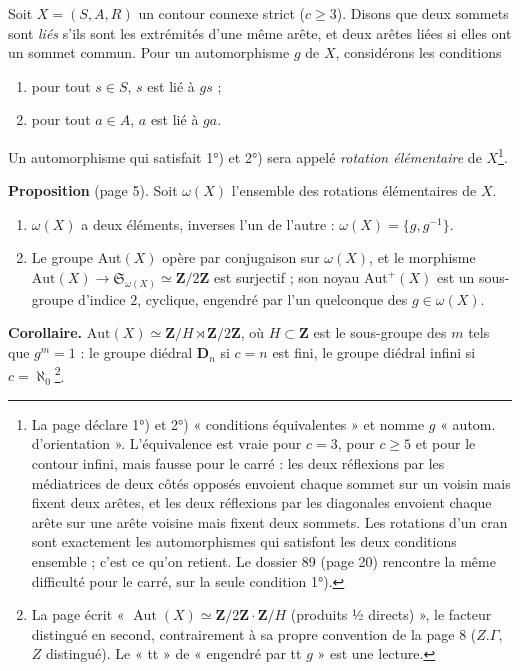 \documentclass[11pt,a4paper]{article}
\begin{document}
Soit $X = (S, A, R)$ un contour connexe strict ($c \geq 3$). Disons que deux
sommets sont \emph{liés} s'ils sont les extrémités d'une même arête, et deux
arêtes liées si elles ont un sommet commun. Pour un automorphisme $g$ de $X$,
considérons les conditions
\begin{enumerate}
\item[1°)] pour tout $s \in S$, $s$ est lié à $g s$ ;
\item[2°)] pour tout $a \in A$, $a$ est lié à $g a$.
\end{enumerate}
Un automorphisme qui satisfait 1°) et 2°) sera appelé \emph{rotation
élémentaire} de $X$\footnote{La page déclare 1°) et 2°) « conditions
équivalentes » et nomme $g$ « autom. d'orientation ». L'équivalence est vraie
pour $c = 3$, pour $c \geq 5$ et pour le contour infini, mais fausse pour le
carré : les deux réflexions par les médiatrices de deux côtés opposés
envoient chaque sommet sur un voisin mais fixent deux arêtes, et les deux
réflexions par les diagonales envoient chaque arête sur une arête voisine
mais fixent deux sommets. Les rotations d'un cran sont exactement les
automorphismes qui satisfont les deux conditions ensemble ; c'est ce qu'on
retient. Le dossier 89 (page 20) rencontre la même difficulté pour le carré,
sur la seule condition 1°).}.

\textbf{Proposition} (page 5). Soit $\omega(X)$ l'ensemble des rotations
élémentaires de $X$.
\begin{enumerate}
\item[b)] $\omega(X)$ a deux éléments, inverses l'un de l'autre :
$\omega(X) = \{g, g^{-1}\}$.
\item[c)] Le groupe $\mathrm{Aut}(X)$ opère par conjugaison sur $\omega(X)$, et
le morphisme $\mathrm{Aut}(X) \to \mathfrak{S}_{\omega(X)} \simeq
\mathbf{Z}/2\mathbf{Z}$ est surjectif ; son noyau $\mathrm{Aut}^{+}(X)$ est un
sous-groupe d'indice $2$, cyclique, engendré par l'un quelconque des $g \in
\omega(X)$.
\end{enumerate}
\textbf{Corollaire.} $\mathrm{Aut}(X) \simeq \mathbf{Z}/H \rtimes
\mathbf{Z}/2\mathbf{Z}$, où $H \subset \mathbf{Z}$ est le sous-groupe des $m$
tels que $g^m = 1$ : le groupe diédral $\mathbf{D}_n$ si $c = n$ est fini, le
groupe diédral infini si $c = \aleph_0$\footnote{La page écrit
« $\operatorname{Aut}(X) \simeq \mathbf{Z}/2\mathbf{Z} \cdot \mathbf{Z}/H$
(produits ½ directs) », le facteur distingué en second, contrairement à sa
propre convention de la page 8 ($Z.\Gamma$, $Z$ distingué). Le « tt » de
« engendré par tt $g$ » est une lecture.}.
\end{document}
